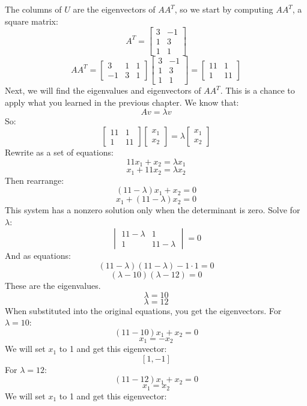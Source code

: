 The columns of $U$ are the eigenvectors of $AA^T$, so we start by computing $AA^T$, a square matrix:
$$ A^T = \begin{bmatrix}
3 & -1\\
1 & 3 \\
1 & 1 
\end{bmatrix}$$
$$AA^T = \begin{bmatrix}
3 & 1 & 1\\
 -1 & 3 & 1
\end{bmatrix}
\begin{bmatrix}
3 & -1\\
1 & 3\\
1 & 1
\end{bmatrix}
= \begin{bmatrix}
11 & 1\\
 1 & 11 
\end{bmatrix}
$$
Next, we will find the eigenvalues and eigenvectors of $AA^T$. This is a chance to apply what you learned in the previous chapter. We know that:
\begin{equation}
Av = \lambda v
\end{equation}
So:
$$
\begin{bmatrix}
11 & 1 \\
 1 & 11  
\end{bmatrix}
\begin{bmatrix}
x_1  \\
x_2 
\end{bmatrix}
=
\lambda 
\begin{bmatrix}
x_1   \\
x_2 
\end{bmatrix}
$$
Rewrite as a set of equations:
$$11x_1 + x_2 = \lambda x_1$$
$$x_1 + 11x_2 = \lambda x_2$$
Then rearrange:
$$(11-\lambda)x_1 + x_2 = 0$$
$$x_1 + (11-\lambda)x_2 = 0$$
This system has a nonzero solution only when the determinant is zero. Solve for $\lambda$:
$$\begin{vmatrix}
11-\lambda & 1 \\
1 & 11-\lambda
\end{vmatrix} = 0$$
And as equations:
$$(11 - \lambda)(11 - \lambda) - 1 \cdot 1 = 0$$
$$(\lambda - 10)(\lambda - 12) = 0$$
These are the eigenvalues.
$$\lambda = 10$$
$$\lambda = 12$$
When substituted into the original equations, you get the eigenvectors. For $\lambda = 10$:
$$(11-10)x_1 + x_2 = 0$$
$$x_1 = -x_2$$
We will set $x_1$ to 1 and get this eigenvector:
$$\left[ 1,-1 \right]$$
For $\lambda = 12$:
$$(11-12)x_1 + x_2 = 0$$
$$x_1 = x_2$$
We will set $x_1$ to 1 and get this eigenvector:
